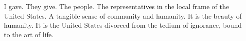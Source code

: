 

I gave.  They give.  The people.  The representatives in the local
frame of the United States.  A tangible sense of community and
humanity.  It is the beauty of humanity.  It is the United States
divorced from the tedium of ignorance, bound to the art of life.


\bye
